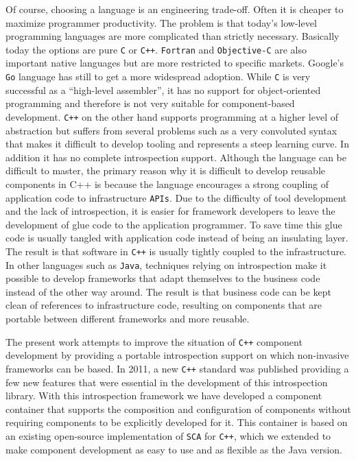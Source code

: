 Of course, choosing a language is an engineering trade-off. Often it is cheaper to maximize programmer
productivity. The problem is that today's low-level programming languages are more complicated than
strictly necessary. Basically today the options are pure \texttt{C} or \texttt{C++}. \texttt{Fortran}
and \texttt{Objective-C} are also important native languages but are more restricted to specific markets.
Google's \texttt{Go} language has still to get a more widespread adoption. While \texttt{C} is very
successful as a ``high-level assembler'', it has no support for object-oriented programming and therefore
is not very suitable for component-based development. \texttt{C++} on the other hand supports programming
at a higher level of abstraction but suffers from several problems such as a very convoluted syntax that
makes it difficult to develop tooling and represents a steep learning curve. In addition it has no complete
introspection support. Although the language can be difficult to master, the primary reason why it is difficult
to develop reusable components in C++ is because the language encourages a strong coupling of application code
to infrastructure \texttt{APIs}. Due to the difficulty of tool development and the lack of introspection,
it is easier for framework developers to leave the development of glue code to the application
programmer. To save time this glue code is usually tangled with application code instead of being an insulating
layer. The result is that software in \texttt{C++} is usually tightly coupled to the infrastructure. In other languages
such as \texttt{Java}, techniques relying on introspection make it possible to develop frameworks that adapt
themselves to the business code instead of the other way around. The result is that business code can be kept
clean of references to infrastructure code, resulting on components that are portable between different frameworks and more reusable.

The present work attempts to improve the situation of \texttt{C++} component development by providing a portable
introspection support on which non-invasive frameworks can be based. In 2011, a new \texttt{C++} standard was published
\cite{CPP11} providing a few new features that were essential in the development of this introspection library.
With this introspection framework we have developed a component container that supports the composition and configuration
of components without requiring components to be explicitly developed for it. This container is based on an existing
open-source implementation of \texttt{SCA} for \texttt{C++}, which we extended to make component development as easy to use and as
flexible as the Java version.

